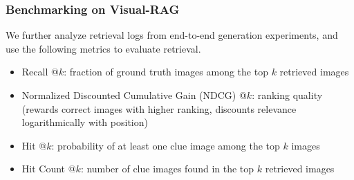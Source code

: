 \documentclass[aspectratio=1610]{beamer}
\begin{document}
    \begin{frame}
        \frametitle{Benchmarking on Visual-RAG}
        We further analyze retrieval logs from end-to-end generation experiments, 
        and use the following metrics to evaluate retrieval.
        \begin{itemize}
            \item Recall @$k$: fraction of ground truth images among the top $k$ retrieved images
            \item Normalized Discounted Cumulative Gain (NDCG) @$k$: ranking quality (rewards correct images with higher ranking,
                    discounts relevance logarithmically with position)
            \item Hit @$k$: probability of at least one clue image among the top $k$ images
            \item Hit Count @$k$: number of clue images found in the top $k$ retrieved images
        \end{itemize}
    \end{frame}


    
\end{document}
